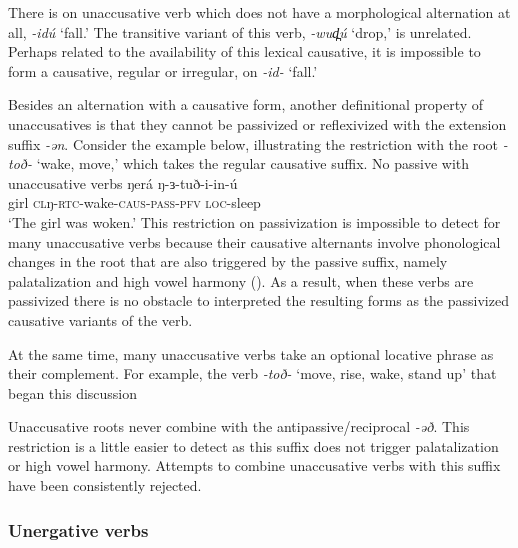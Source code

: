 There is on unaccusative verb which does not have a morphological alternation at all, \textit{-idú} `fall.' The transitive variant of this verb, \textit{-wud̪ú} `drop,' is unrelated. Perhaps related to the availability of this lexical causative, it is impossible to form a causative, regular or irregular, on \textit{-id-} `fall.' 

Besides an alternation with a causative form, another definitional property of unaccusatives is that they cannot be passivized or reflexivized with the extension suffix \textit{-ən}. Consider the example below, illustrating the restriction with the root \textit{-toð-} `wake, move,' which takes the regular causative suffix.
\ea No passive with unaccusative verbs \label{ex:ch12:unaccnopass}
\ea \gll  	ŋerá ŋ-ɜ-tuð-i-in-ú \\
			girl	\textsc{cl}ŋ-\textsc{rtc}-wake-\textsc{caus-pass-pfv} \textsc{loc}-sleep \\
	\glt	‘The girl was woken.’ 
\z 
\z 
This restriction on passivization is impossible to detect for many unaccusative verbs because their causative alternants involve phonological changes in the root that are also triggered by the passive suffix, namely palatalization and high vowel harmony (). As a result, when these verbs are passivized there is no obstacle to interpreted the resulting forms as the passivized causative variants of the verb.

At the same time, many unaccusative verbs take an optional locative phrase as their complement. For example, the verb \textit{-toð-} `move, rise, wake, stand up' that began this discussion 



Unaccusative roots never combine with the antipassive/reciprocal \textit{-əð}. This restriction is a little easier to detect as this suffix does not trigger palatalization or high vowel harmony. Attempts to combine unaccusative verbs with this suffix have been consistently rejected.


\subsubsection{Unergative verbs}


